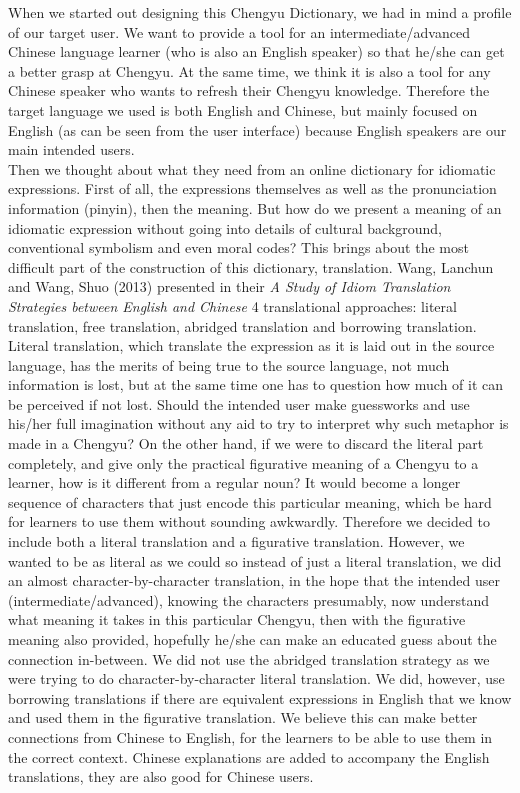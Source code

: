 \documentclass[11pt]{article} %
\begin{document}
\indent When we started out designing this Chengyu Dictionary, we had in mind a profile of our target user. We want to provide a tool for an intermediate/advanced Chinese language learner (who is also an English speaker) so that he/she can get a better grasp at Chengyu. At the same time, we think it is also a tool for any Chinese speaker who wants to refresh their Chengyu knowledge. Therefore the target language we used is both English and Chinese, but mainly focused on English (as can be seen from the user interface) because English speakers are our main intended users.\\
Then we thought about what they need from an online dictionary for idiomatic expressions. First of all, the expressions themselves as well as the pronunciation information (pinyin), then the meaning. But how do we present a meaning of an idiomatic expression without going into details of cultural background, conventional symbolism and even moral codes? This brings about the most difficult part of the construction of this dictionary, translation. Wang, Lanchun and Wang, Shuo (2013) presented in their \textit{A Study of Idiom Translation Strategies between English and Chinese} 4 translational approaches: literal translation, free translation, abridged translation and borrowing translation. Literal translation, which translate the expression as it is laid out in the source language, has the merits of being true to the source language, not much information is lost, but at the same time one has to question how much of it can be perceived if not lost. Should the intended user make guessworks and use his/her full imagination without any aid to try to interpret why such metaphor is made in a Chengyu? On the other hand, if we were to discard the literal part completely, and give only the practical figurative meaning of a Chengyu to a learner, how is it different from a regular noun? It would become a longer sequence of characters  that just encode this particular meaning, which be hard for learners to use them without sounding awkwardly. Therefore we decided to include both a literal translation and a figurative translation. However, we wanted to be as literal as we could so instead of just a literal translation, we did an almost character-by-character translation, in the hope that the intended user (intermediate/advanced), knowing the characters presumably, now understand what meaning it takes in this particular Chengyu, then with the figurative meaning also provided, hopefully he/she can make an educated guess about the connection in-between. We did not use the abridged translation strategy as we were trying to do character-by-character literal translation. We did, however, use borrowing translations if there are equivalent expressions in English that we know and used them in the figurative translation. We believe this can make better connections from Chinese to English, for the learners to be able to use them in the correct context. Chinese explanations are added to accompany the English translations, they are also good for Chinese users.\\
\end{document}
